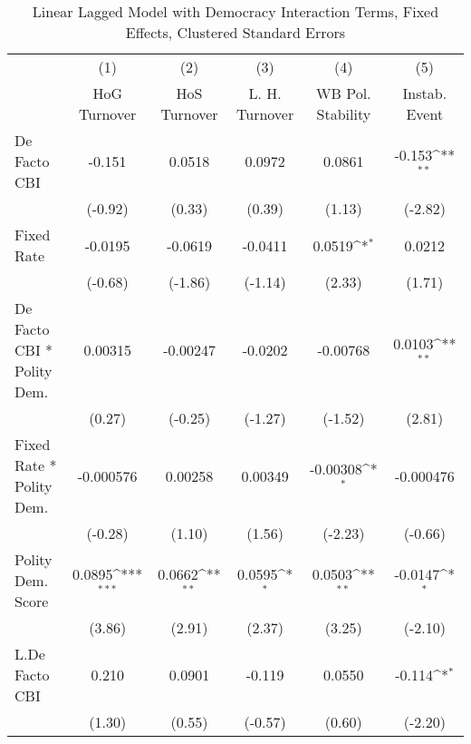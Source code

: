 {
\def\sym#1{\ifmmode^{#1}\else\(^{#1}\)\fi}
\begin{longtable}{l*{5}{c}}
\caption{Linear Lagged Model with Democracy Interaction Terms, Fixed Effects, Clustered Standard Errors \label{demintlagsDF}}\\
\hline\hline\endfirsthead\hline\endhead\hline\endfoot\endlastfoot
                &\multicolumn{1}{c}{(1)}&\multicolumn{1}{c}{(2)}&\multicolumn{1}{c}{(3)}&\multicolumn{1}{c}{(4)}&\multicolumn{1}{c}{(5)}\\
                &\multicolumn{1}{c}{HoG Turnover}&\multicolumn{1}{c}{HoS Turnover}&\multicolumn{1}{c}{L. H. Turnover}&\multicolumn{1}{c}{WB Pol. Stability}&\multicolumn{1}{c}{Instab. Event}\\
\hline
De Facto CBI    &   -0.151         &   0.0518         &   0.0972         &   0.0861         &   -0.153\sym{**} \\
                &  (-0.92)         &   (0.33)         &   (0.39)         &   (1.13)         &  (-2.82)         \\
[1em]
Fixed Rate      &  -0.0195         &  -0.0619         &  -0.0411         &   0.0519\sym{*}  &   0.0212         \\
                &  (-0.68)         &  (-1.86)         &  (-1.14)         &   (2.33)         &   (1.71)         \\
[1em]
De Facto CBI * Polity Dem.&  0.00315         & -0.00247         &  -0.0202         & -0.00768         &   0.0103\sym{**} \\
                &   (0.27)         &  (-0.25)         &  (-1.27)         &  (-1.52)         &   (2.81)         \\
[1em]
Fixed Rate * Polity Dem.&-0.000576         &  0.00258         &  0.00349         & -0.00308\sym{*}  &-0.000476         \\
                &  (-0.28)         &   (1.10)         &   (1.56)         &  (-2.23)         &  (-0.66)         \\
[1em]
Polity Dem. Score&   0.0895\sym{***}&   0.0662\sym{**} &   0.0595\sym{*}  &   0.0503\sym{**} &  -0.0147\sym{*}  \\
                &   (3.86)         &   (2.91)         &   (2.37)         &   (3.25)         &  (-2.10)         \\
[1em]
L.De Facto CBI  &    0.210         &   0.0901         &   -0.119         &   0.0550         &   -0.114\sym{*}  \\
                &   (1.30)         &   (0.55)         &  (-0.57)         &   (0.60)         &  (-2.20)         \\

\end{longtable}}
